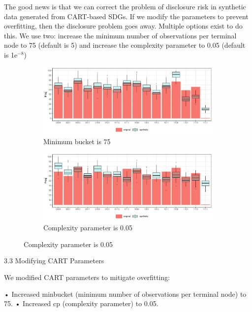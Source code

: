 \documentclass[runningheads]{llncs}
\begin{document}
The good news is that we can correct the problem of disclosure risk in synthetic data generated from CART-based SDGs.  If we modify the parameters to prevent overfitting, then the disclosure problem goes away.  Multiple options exist to do this.  We use two: increase the minimum number of observations per terminal node to 75 (default is 5) and increase the complexity parameter to 0.05 (default is 1e$^{-8}$)

\begin{figure}[!h]
    \centering
    \caption{Compare original and synthetic data}
    \begin{subfigure}{0.48\textwidth}
        \includegraphics[width=\textwidth]{../graphs/graph_cart_modified_mb_histogram_compare_100.pdf}
        \caption{Minimum bucket is 75}
        \label{fig:attacker_modified_mb}
    \end{subfigure}
    \hfill
    \begin{subfigure}{0.48\textwidth}
        \includegraphics[width=\textwidth]{../graphs/graph_cart_modified_cp_histogram_compare_100.pdf}
        \caption{Complexity parameter is 0.05}
        \label{fig:attacker_modified_cp}
    \end{subfigure}
    \label{fig:compare}
\end{figure}


3.3 Modifying CART Parameters

We modified CART parameters to mitigate overfitting:

    •   Increased minbucket (minimum number of observations per terminal node) to 75.
    •   Increased cp (complexity parameter) to 0.05.
\end{document}
